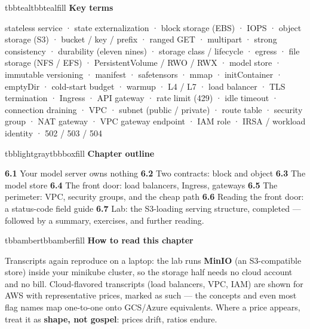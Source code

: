 \begin{calloutbox}{tbbteal}{tbbtealfill}
{\normalsize\bfseries\color{tbbteal}Key terms}\par\vspace{3pt}
stateless service · state externalization · block storage (EBS) · IOPS · object storage (S3) · bucket / key / prefix · ranged GET · multipart · strong consistency · durability (eleven nines) · storage class / lifecycle · egress · file storage (NFS / EFS) · PersistentVolume / RWO / RWX · model store · immutable versioning · manifest · safetensors · mmap · initContainer · emptyDir · cold-start budget · warmup · L4 / L7 · load balancer · TLS termination · Ingress · API gateway · rate limit (429) · idle timeout · connection draining · VPC · subnet (public / private) · route table · security group · NAT gateway · VPC gateway endpoint · IAM role · IRSA / workload identity · 502 / 503 / 504
\end{calloutbox}

\vspace{5.0pt}

\begin{calloutbox}{tbblightgray}{tbbboxfill}
{\normalsize\bfseries\color{tbbink}Chapter outline}\par\vspace{3pt}
\textbf{6.1} Your model server owns nothing    \textbf{6.2} Two contracts: block and object    \textbf{6.3} The model store    \textbf{6.4} The front door: load balancers, Ingress, gateways    \textbf{6.5} The perimeter: VPC, security groups, and the cheap path    \textbf{6.6} Reading the front door: a status-code field guide    \textbf{6.7} Lab: the S3-loading serving structure, completed — followed by a summary, exercises, and further reading.
\end{calloutbox}

\vspace{3.0pt}

\begin{calloutbox}{tbbamber}{tbbamberfill}
{\normalsize\bfseries\color{tbbamberdark}How to read this chapter}\par\vspace{3pt}
Transcripts again reproduce on a laptop: the lab runs \textbf{MinIO} (an S3-compatible store) inside your minikube cluster, so the storage half needs no cloud account and no bill. Cloud-flavored transcripts (load balancers, VPC, IAM) are shown for AWS with representative prices, marked as such — the concepts and even most flag names map one-to-one onto GCS/Azure equivalents. Where a price appears, treat it as \textbf{shape, not gospel}: prices drift, ratios endure.
\end{calloutbox}

